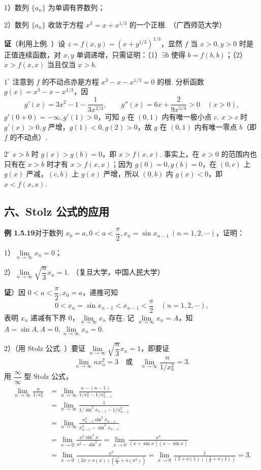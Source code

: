 \documentclass[UTF8, 12pt, fontset=fandol, oneside]{ctexart}
\begin{document}
1）数列 $\{a_n\}$ 为单调有界数列；

2）数列 $\{a_n\}$ 收敛于方程 $x^3=x+x^{1/3}$ 的一个正根. （广西师范大学）

\noindent\textbf{证}\quad （利用上例. ）设 $z=f(x,y)=(x+y^{1/3})^{1/3}$，显然 $f$ 当 $x>0,y>0$ 时是正值连续函数，对 $x,y$ 单调递增，只需证明：（1）$\exists b$ 使得 $b=f(b,b)$；（2）$x>f(x,x)$ 当且仅当 $x>b$.

$1^\circ$ 注意到 $f$ 的不动点亦是方程 $x^3-x-x^{1/3}=0$ 的根. 分析函数 $g(x)=x^3-x-x^{1/3}$，因
\[
  g'(x)=3x^2-1-\frac1{3x^{2/3}},\qquad
  g''(x)=6x+\frac{2}{9x^{5/3}}>0\quad (x>0),
\]
$g'(0+0)=-\infty,g'(1)>0$，可知 $g$ 在 $(0,1)$ 内有唯一极小点 $c$. $x>c$ 时 $g'(x)>0,g$ 严增，$g(1)<0,g(2)>0$，故 $g$ 在 $(0,1)$ 内有唯一零点 $b$（即 $f$ 的不动点）.

$2^\circ$ $x>b$ 时 $g(x)>g(b)=0$，即 $x>f(x,x)$. 事实上，在 $x>0$ 的范围内也只有在 $x>b$ 时才有 $x>f(x,x)$；因为 $g(0)=0,g(b)=0$，在 $(0,c)$ 上 $g(x)$ 严减，$(c,b)$ 上 $g(x)$ 严增，所以 $(0,b)$ 内 $g(x)<0$，即 $x<f(x,x)$.

\subsection*{六、Stolz 公式的应用}

\noindent\textbf{例 1.5.19}\quad 对于数列 $x_0=a,0<a<\dfrac{\pi}{2},x_n=\sin x_{n-1}\ (n=1,2,\cdots)$，证明：

1）$\lim\limits_{n\to\infty}x_n=0$；

2）$\lim\limits_{n\to\infty}\sqrt{\dfrac{n}{3}}x_n=1$. （复旦大学，中国人民大学）

\noindent\textbf{证}）因 $0<a<\dfrac{\pi}{2},x_0=a$，递推可知
\[
  0<x_n=\sin x_{n-1}<x_{n-1}<\frac{\pi}{2}\quad (n=1,2,\cdots),
\]
表明 $x_n$ 递减有下界 $0$，$\lim\limits_{n\to\infty}x_n$ 存在. 记 $\lim\limits_{n\to\infty}x_n=A$，知 $A=\sin A,A=0,\lim\limits_{n\to\infty}x_n=0$.

2）（用 Stolz 公式. ）要证 $\lim\limits_{n\to\infty}\sqrt{\dfrac{n}{3}}x_n=1$，即要证
\[
  \lim_{n\to\infty} nx_n^2=3
  \quad\text{或}\quad
  \lim_{n\to\infty}\frac{n}{1/x_n^2}=3.
\]
用 $\dfrac{\infty}{\infty}$ 型 Stolz 公式，
\[
\begin{aligned}
  \lim_{n\to\infty}\frac{n}{1/x_n^2}
  &=\lim_{n\to\infty}\frac{n-(n-1)}{1/x_n^2-1/x_{n-1}^2}\\
  &=\lim_{n\to\infty}\frac{1}{1/\sin^2 x_{n-1}-1/x_{n-1}^2}\\
  &=\lim_{n\to\infty}\frac{x_{n-1}^2\sin^2 x_{n-1}}{x_{n-1}^2-\sin^2 x_{n-1}}\\
  &=\lim_{x\to 0}\frac{x^2\sin^2 x}{x^2-\sin^2 x}
   =\lim_{x\to 0}\frac{x^4}{(x+\sin x)(x-\sin x)}\\
  &=\lim_{x\to 0}\frac{x^4}{(2x+o(x))\left(\frac{x^3}{6}+o(x^3)\right)}
   =\lim_{x\to 0}\frac{1}{(2+o(1))\left(\frac16+o(1)\right)}
   =3.
\end{aligned}
\]
\end{document}
